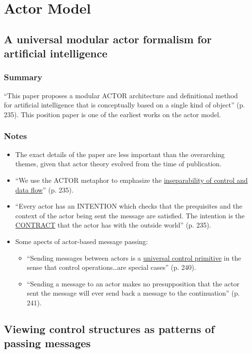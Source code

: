 \section{Actor Model}
\subsection{A universal modular actor formalism for artificial intelligence}
\subsubsection*{Summary}
``This paper proposes a modular ACTOR architecture and definitional method for artificial intelligence that is conceptually based on a single kind of object'' (p. 235). This position paper is one of the earliest works on the actor model.
\subsubsection*{Notes}
\begin{itemize}
\item The exact details of the paper are less important than the overarching themes, given that actor theory evolved from the time of publication.
\item ``We use the ACTOR metaphor to emphasize the \underline{inseparability of control and data flow}'' (p. 235).
\item ``Every actor has an INTENTION which checks that the prequisites and the context of the actor being sent the message are satisfied. The intention is the \underline{CONTRACT} that the actor has with the outside world'' (p. 235).
\item Some apects of actor-based message passing:
	\begin{itemize}
	\item ``Sending messages between actors is a \underline{universal control primitive} in the sense that control operations{\ldots}are special cases'' (p. 240).
	\item ``Sending a message to an actor makes no presupposition that the actor sent the message will ever send back a message to the continuation'' (p. 241).
	\end{itemize}
\end{itemize}

\subsection{Viewing control structures as patterns of passing messages}
